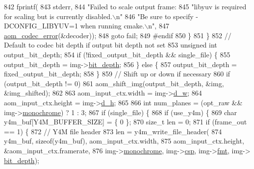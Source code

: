 \begin{DoxyCodeInclude}
{{{{{{{{{{{{{{{{{{{{{{{{{{{{{{{{{{{{{{{{{{{{{{842             fprintf(
843                 stderr,
844                 \textcolor{stringliteral}{"Failed to scale output frame: %
845                 \textcolor{stringliteral}{"libyuv is required for scaling but is currently disabled.\(\backslash\)n"}
846                 \textcolor{stringliteral}{"Be sure to specify -DCONFIG\_LIBYUV=1 when running cmake.\(\backslash\)n"},
847                 \hyperlink{group__codec_ga50949c0854605c722832bbfb0803f5f4}{aom\_codec\_error}(&decoder));
848             \textcolor{keywordflow}{goto} fail;
849 \textcolor{preprocessor}{#endif}
850           \}
851         \}
852         \textcolor{comment}{// Default to codec bit depth if output bit depth not set}
853         \textcolor{keywordtype}{unsigned} \textcolor{keywordtype}{int} output\_bit\_depth;
854         \textcolor{keywordflow}{if} (!fixed\_output\_bit\_depth && single\_file) \{
855           output\_bit\_depth = img->\hyperlink{structaom__image_a46ed9ffd741938d306a0db5a24bdcf8e}{bit\_depth};
856         \} \textcolor{keywordflow}{else} \{
857           output\_bit\_depth = fixed\_output\_bit\_depth;
858         \}
859         \textcolor{comment}{// Shift up or down if necessary}
860         \textcolor{keywordflow}{if} (output\_bit\_depth != 0)
861           aom\_shift\_img(output\_bit\_depth, &img, &img\_shifted);
862 
863         aom\_input\_ctx.width = img->\hyperlink{structaom__image_a89f80b1f58d608b9d2080635f4359034}{d\_w};
864         aom\_input\_ctx.height = img->\hyperlink{structaom__image_ab986419a1f0fff93a2dc505f47194988}{d\_h};
865 
866         \textcolor{keywordtype}{int} num\_planes = (opt\_raw && img->\hyperlink{structaom__image_ab7886616025ff8bd0bb96d967fca9ad8}{monochrome}) ? 1 : 3;
867         \textcolor{keywordflow}{if} (single\_file) \{
868           \textcolor{keywordflow}{if} (use\_y4m) \{
869             \textcolor{keywordtype}{char} y4m\_buf[Y4M\_BUFFER\_SIZE] = \{ 0 \};
870             \textcolor{keywordtype}{size\_t} len = 0;
871             \textcolor{keywordflow}{if} (frame\_out == 1) \{
872               \textcolor{comment}{// Y4M file header}
873               len = y4m\_write\_file\_header(
874                   y4m\_buf, \textcolor{keyword}{sizeof}(y4m\_buf), aom\_input\_ctx.width,
875                   aom\_input\_ctx.height, &aom\_input\_ctx.framerate,
876                   img->\hyperlink{structaom__image_ab7886616025ff8bd0bb96d967fca9ad8}{monochrome}, img->\hyperlink{structaom__image_a4f235c521bc95a061e9e0b2a3d5d457e}{csp}, img->\hyperlink{structaom__image_a6c64b1ab918d80d52eb8f5d6d957e825}{fmt}, img->
      \hyperlink{structaom__image_a46ed9ffd741938d306a0db5a24bdcf8e}{bit\_depth});
}}}}}}}}}}}}}}}}}}}}}}}}}}}}}}}}}}}}}}}}}}}}}}}
\end{DoxyCodeInclude}
